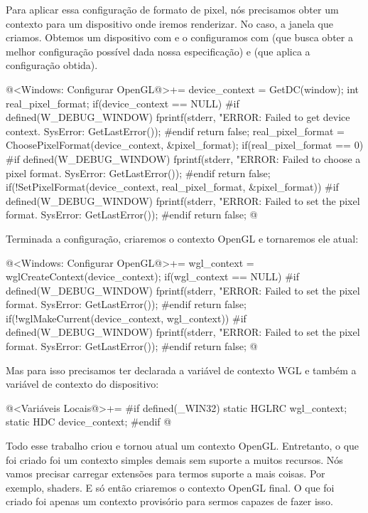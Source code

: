 Para aplicar essa configuração de formato de pixel, nós precisamos
obter um contexto para um dispositivo onde iremos renderizar. No caso,
a janela que criamos. Obtemos um dispositivo com  e
o configuramos com  (que busca obter a
melhor configuração possível dada nossa especificação)
e  (que aplica a configuração obtida).

\iniciocodigo
@<Windows: Configurar OpenGL@>+=
device_context = GetDC(window);
{
  int real_pixel_format;
  if(device_context == NULL){
#if defined(W_DEBUG_WINDOW)
    fprintf(stderr, "ERROR: Failed to get device context. SysError: %
            GetLastError());
#endif
    return false;
  }
  real_pixel_format = ChoosePixelFormat(device_context, &pixel_format);
  if(real_pixel_format == 0){
#if defined(W_DEBUG_WINDOW)
    fprintf(stderr, "ERROR: Failed to choose a pixel format. SysError: %
            GetLastError());
#endif
    return false;
  }
  if(!SetPixelFormat(device_context, real_pixel_format, &pixel_format)){
#if defined(W_DEBUG_WINDOW)
    fprintf(stderr, "ERROR: Failed to set the pixel format. SysError: %
            GetLastError());
#endif
    return false;
  }
}
@
\fimcodigo

Terminada a configuração, criaremos o contexto OpenGL e tornaremos ele
atual:

\iniciocodigo
@<Windows: Configurar OpenGL@>+=
wgl_context = wglCreateContext(device_context);
if(wgl_context == NULL){
#if defined(W_DEBUG_WINDOW)
  fprintf(stderr, "ERROR: Failed to set the pixel format. SysError: %
          GetLastError());
#endif
  return false;
}
if(!wglMakeCurrent(device_context, wgl_context)){
#if defined(W_DEBUG_WINDOW)
  fprintf(stderr, "ERROR: Failed to set the pixel format. SysError: %
          GetLastError());
#endif
  return false;
}
@
\fimcodigo

Mas para isso precisamos ter declarada a variável de contexto WGL e
também a variável de contexto do dispositivo:

\iniciocodigo
@<Variáveis Locais@>+=
#if defined(_WIN32)
static HGLRC wgl_context;
static HDC device_context;
#endif
@
\fimcodigo

Todo esse trabalho criou e tornou atual um contexto
OpenGL. Entretanto, o que foi criado foi um contexto simples demais
sem suporte a muitos recursos. Nós vamos precisar carregar extensões
para termos suporte a mais coisas. Por exemplo, shaders. E só então
criaremos o contexto OpenGL final. O que foi criado foi apenas um
contexto provisório para sermos capazes de fazer isso.

